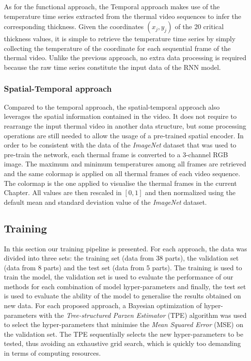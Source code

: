 As for the functional approach, the Temporal approach makes use of the temperature time series extracted from the thermal video sequences to infer the corresponding thickness. Given the coordinates $(x_j, y_j)$ of the 20 critical thickness values, it is simple to retrieve the temperature time series by simply collecting the temperature of the coordinate for each sequential frame of the thermal video. Unlike the previous approach, no extra data processing is required because the raw time series constitute the input data of the RNN model. 

\subsubsection{Spatial-Temporal approach}
Compared to the temporal approach, the spatial-temporal approach also leverages the spatial information contained in the video. It does not require to rearrange the input thermal video in another data structure, but some processing operations are still needed to allow the usage of a pre-trained spatial encoder. In order to be consistent with the data of the \textit{ImageNet} dataset \citep{deng2009imagenet} that was used  to pre-train the network, each thermal frame is converted to a 3-channel RGB image. The maximum and minimum temperatures among all frames are retrieved and the same colormap is applied on all thermal frames of each video sequence. The colormap is the one applied to visualise the thermal frames in the current Chapter. All values are then rescaled in $[0, 1]$ and then normalized using the default mean and standard deviation value of the \textit{ImageNet} dataset.

\subsection{Training}

In this section our training pipeline is presented. For each approach, the data was divided into three sets: the training set (data from 38 parts), the validation set (data from 8 parts) and the test set (data from 5 parts). The training is used to train the model, the validation set is used to evaluate the performance of our methods for each combination of model hyper-parameters and finally, the test set is used to evaluate the ability of the model to generalise the results obtained on new data. For each proposed approach, a Bayesian optimization of hyper-parameters with the \textit{Tree-structured Parzen Estimator} (TPE) \citep{bergstra2011algorithms} algorithm was used to select the hyper-parameters that minimise the \textit{Mean Squared Error} (MSE) on the validation set. The TPE sequentially selects the new hyper-parameters to be tested, thus avoiding an exhaustive grid search, which is quickly too demanding in terms of computing resources.

